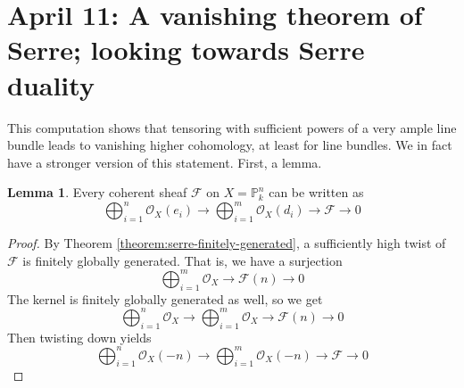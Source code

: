 \documentclass[10pt,reqno]{amsart}
\theoremstyle{definition}
\newtheorem{lemma}[theorem]{Lemma}
\theoremstyle{remark}
\numberwithin{equation}{section}
\numberwithin{theorem}{section}
\newcommand{\OO}{{\mathcal O}}
\newcommand{\FF}{{\mathscr F}}
\newcommand{\PP}{{\mathbb P}}
\begin{document}
\section{April 11:  A vanishing theorem of Serre; looking towards Serre duality}

This computation shows that tensoring with sufficient powers of a very ample line bundle leads to vanishing higher cohomology, at least for line bundles. We in fact have a stronger version of this statement. First, a lemma.

\begin{lemma} Every coherent sheaf $\FF$ on $X = \PP^n_k$ can be written as 
\[\bigoplus_{i =1}^n \OO_X(e_i) \to \bigoplus_{i=1}^m \OO_X(d_i) \to \FF \to 0\]
\end{lemma}
\begin{proof}
By Theorem \ref{theorem:serre-finitely-generated}, a sufficiently high twist of $\FF$ is finitely globally generated. That is, we have a surjection
\[\bigoplus_{i=1}^m \OO_X \to \FF(n) \to 0\]
The kernel is finitely globally generated as well, so we get
\[\bigoplus_{i =1}^n \OO_X \to \bigoplus_{i=1}^m \OO_X \to \FF(n) \to 0\]
Then twisting down yields
\[\bigoplus_{i =1}^n \OO_X(-n) \to \bigoplus_{i=1}^m \OO_X(-n) \to \FF \to 0\]
\end{proof}
\end{document}
